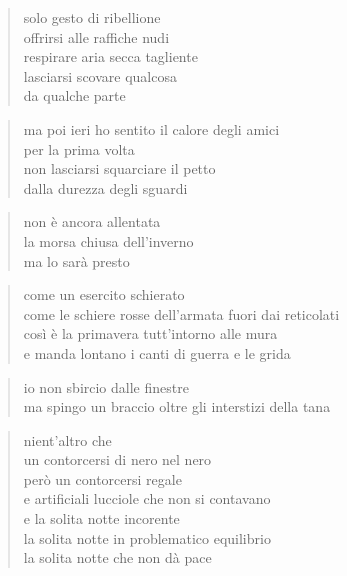 \clearpage


\begin{verse}
    solo gesto di ribellione\\
    offrirsi alle raffiche nudi\\
    respirare aria secca tagliente\\
    lasciarsi scovare qualcosa\\
    da qualche parte
\end{verse}

\begin{verse}
    ma poi ieri ho sentito il calore degli amici\\
    per la prima volta\\
    non lasciarsi squarciare il petto\\
    dalla durezza degli sguardi
\end{verse}

\clearpage


\begin{verse}
    non è ancora allentata\\
    la morsa chiusa dell'inverno\\
    ma lo sarà presto
\end{verse}

\begin{verse}
    come un esercito schierato\\
    come le schiere rosse dell'armata fuori dai reticolati\\
    così è la primavera tutt'intorno alle mura\\
    e manda lontano i canti di guerra e le grida
\end{verse}

\begin{verse}
    io non sbircio dalle finestre\\
    ma spingo un braccio oltre gli interstizi della tana
\end{verse}

\clearpage


\begin{verse}
    nient'altro che\\
    un contorcersi di nero nel nero\\
    però un contorcersi regale\\
    e artificiali lucciole che non si contavano\\
    e la solita notte incorente\\
    la solita notte in problematico equilibrio\\
    la solita notte che non dà pace
\end{verse}

